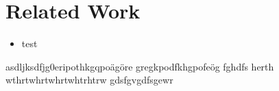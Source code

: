 \section{Related Work} \label{subsection:introduction-related}
\begin{itemize}
    \item test
\end{itemize}
asdljksdfjg0eripothkgqpoägöre
gregkpodfkhgpofeög
fghdfs
herth
wthrtwhrtwhrtwhtrhtrw
gdsfgvgdfsgewr
